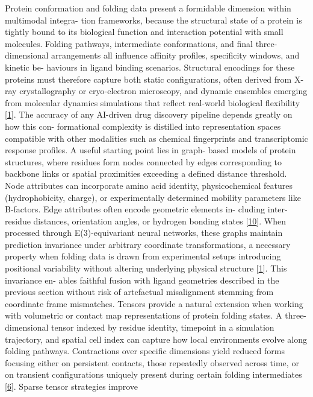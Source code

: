 \documentclass[
]{article}
\begin{document}
Protein conformation and folding data present a formidable dimension
within multimodal integra- tion frameworks, because the structural state
of a protein is tightly bound to its biological function and interaction
potential with small molecules. Folding pathways, intermediate
conformations, and final three-dimensional arrangements all influence
affinity profiles, specificity windows, and kinetic be- haviours in
ligand binding scenarios. Structural encodings for these proteins must
therefore capture both static configurations, often derived from X-ray
crystallography or cryo-electron microscopy, and dynamic ensembles
emerging from molecular dynamics simulations that reflect real-world
biological flexibility {[}\hyperref[_bookmark41]{1}{]}. The accuracy of
any AI-driven drug discovery pipeline depends greatly on how this con-
formational complexity is distilled into representation spaces
compatible with other modalities such as chemical fingerprints and
transcriptomic response profiles. A useful starting point lies in graph-
based models of protein structures, where residues form nodes connected
by edges corresponding to backbone links or spatial proximities
exceeding a defined distance threshold. Node attributes can incorporate
amino acid identity, physicochemical features (hydrophobicity, charge),
or experimentally determined mobility parameters like B-factors. Edge
attributes often encode geometric elements in- cluding inter-residue
distances, orientation angles, or hydrogen bonding states
{[}\hyperref[_bookmark50]{10}{]}. When processed through
E(3)-equivariant neural networks, these graphs maintain prediction
invariance under arbitrary coordinate transformations, a necessary
property when folding data is drawn from experimental setups introducing
positional variability without altering underlying physical structure
{[}\hyperref[_bookmark41]{1}{]}. This invariance en- ables faithful
fusion with ligand geometries described in the previous section without
risk of artefactual misalignment stemming from coordinate frame
mismatches. Tensors provide a natural extension when working with
volumetric or contact map representations of protein folding states. A
three-dimensional tensor indexed by residue identity, timepoint in a
simulation trajectory, and spatial cell index can capture how local
environments evolve along folding pathways. Contractions over specific
dimensions yield reduced forms focusing either on persistent contacts,
those repeatedly observed across time, or on transient configurations
uniquely present during certain folding intermediates
{[}\hyperref[_bookmark46]{6}{]}. Sparse tensor strategies improve
\end{document}
